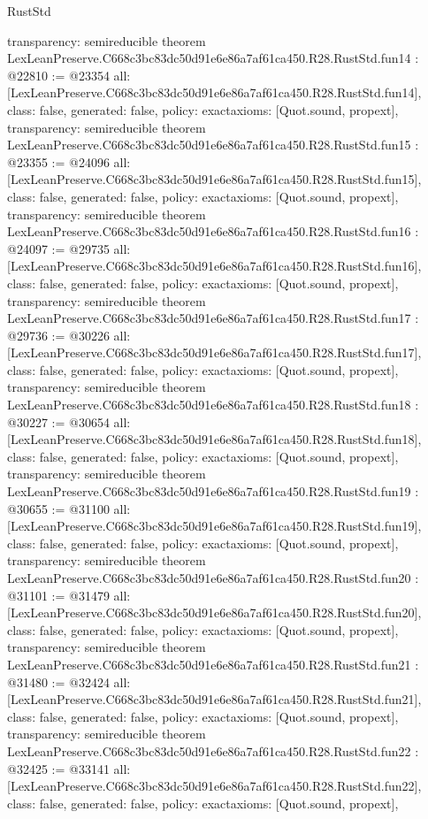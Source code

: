 \begin{lexlean}{RustStd}
\begin{coremodule}
{  transparency: semireducible
}
theorem LexLeanPreserve.C668c3bc83dc50d91e6e86a7af61ca450.R28.RustStd.fun14 : @22810 := @23354 {
  all: [LexLeanPreserve.C668c3bc83dc50d91e6e86a7af61ca450.R28.RustStd.fun14],
  class: false,
  generated: false,
  policy: exact{axioms: [Quot.sound, propext]},
  transparency: semireducible
}
theorem LexLeanPreserve.C668c3bc83dc50d91e6e86a7af61ca450.R28.RustStd.fun15 : @23355 := @24096 {
  all: [LexLeanPreserve.C668c3bc83dc50d91e6e86a7af61ca450.R28.RustStd.fun15],
  class: false,
  generated: false,
  policy: exact{axioms: [Quot.sound, propext]},
  transparency: semireducible
}
theorem LexLeanPreserve.C668c3bc83dc50d91e6e86a7af61ca450.R28.RustStd.fun16 : @24097 := @29735 {
  all: [LexLeanPreserve.C668c3bc83dc50d91e6e86a7af61ca450.R28.RustStd.fun16],
  class: false,
  generated: false,
  policy: exact{axioms: [Quot.sound, propext]},
  transparency: semireducible
}
theorem LexLeanPreserve.C668c3bc83dc50d91e6e86a7af61ca450.R28.RustStd.fun17 : @29736 := @30226 {
  all: [LexLeanPreserve.C668c3bc83dc50d91e6e86a7af61ca450.R28.RustStd.fun17],
  class: false,
  generated: false,
  policy: exact{axioms: [Quot.sound, propext]},
  transparency: semireducible
}
theorem LexLeanPreserve.C668c3bc83dc50d91e6e86a7af61ca450.R28.RustStd.fun18 : @30227 := @30654 {
  all: [LexLeanPreserve.C668c3bc83dc50d91e6e86a7af61ca450.R28.RustStd.fun18],
  class: false,
  generated: false,
  policy: exact{axioms: [Quot.sound, propext]},
  transparency: semireducible
}
theorem LexLeanPreserve.C668c3bc83dc50d91e6e86a7af61ca450.R28.RustStd.fun19 : @30655 := @31100 {
  all: [LexLeanPreserve.C668c3bc83dc50d91e6e86a7af61ca450.R28.RustStd.fun19],
  class: false,
  generated: false,
  policy: exact{axioms: [Quot.sound, propext]},
  transparency: semireducible
}
theorem LexLeanPreserve.C668c3bc83dc50d91e6e86a7af61ca450.R28.RustStd.fun20 : @31101 := @31479 {
  all: [LexLeanPreserve.C668c3bc83dc50d91e6e86a7af61ca450.R28.RustStd.fun20],
  class: false,
  generated: false,
  policy: exact{axioms: [Quot.sound, propext]},
  transparency: semireducible
}
theorem LexLeanPreserve.C668c3bc83dc50d91e6e86a7af61ca450.R28.RustStd.fun21 : @31480 := @32424 {
  all: [LexLeanPreserve.C668c3bc83dc50d91e6e86a7af61ca450.R28.RustStd.fun21],
  class: false,
  generated: false,
  policy: exact{axioms: [Quot.sound, propext]},
  transparency: semireducible
}
theorem LexLeanPreserve.C668c3bc83dc50d91e6e86a7af61ca450.R28.RustStd.fun22 : @32425 := @33141 {
  all: [LexLeanPreserve.C668c3bc83dc50d91e6e86a7af61ca450.R28.RustStd.fun22],
  class: false,
  generated: false,
  policy: exact{axioms: [Quot.sound, propext]},
}
\end{coremodule}
\end{lexlean}
